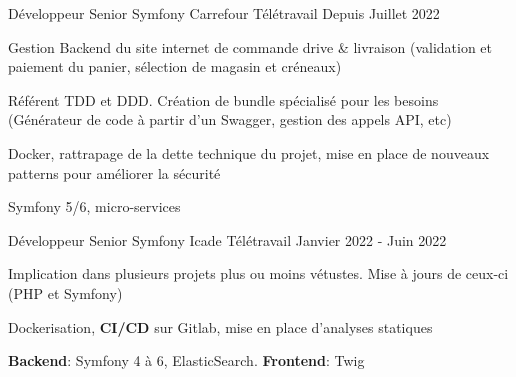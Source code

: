 

\begin{cventries}
  \cventry
    {Développeur Senior Symfony} %
    {Carrefour} %
    {Télétravail} %
    {Depuis Juillet 2022} %
    {
      \begin{cvitems} %
        \item {Gestion Backend du site internet de commande drive \& livraison (validation et paiement du panier, sélection de magasin et créneaux)}
        \item {Référent TDD et DDD. Création de bundle spécialisé pour les besoins (Générateur de code à partir d'un Swagger, gestion des appels API, etc)}
        \item {Docker, rattrapage de la dette technique du projet, mise en place de nouveaux patterns pour améliorer la sécurité}
        \item {Symfony 5/6, micro-services}
      \end{cvitems}
    }

  \cventry
    {Développeur Senior Symfony} %
    {Icade} %
    {Télétravail} %
    {Janvier 2022 - Juin 2022} %
    {
      \begin{cvitems} %
        \item {Implication dans plusieurs projets plus ou moins vétustes. Mise à jours de ceux-ci (PHP et Symfony)}
        \item {Dockerisation, \textbf{CI/CD} sur Gitlab, mise en place d'analyses statiques}
        \item {\textbf{Backend}: Symfony 4 à 6, ElasticSearch. \textbf{Frontend}: Twig}
      \end{cvitems}
    }


\end{cventries}
